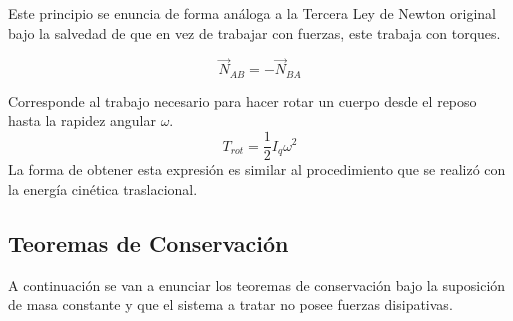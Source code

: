 \documentclass[/home/hernan/Documentos/Apuntes_mecanica_teorica/main.tex]{subfiles}
\begin{document}
	\newpage
	\begin{definition} 
		Este principio se enuncia de forma análoga a la Tercera Ley de Newton original bajo la salvedad de que en vez de trabajar con fuerzas, este trabaja con torques.

		\begin{equation}
			\vec{N}_{AB} = - \vec{N}_{BA}
			\label{eq: NThirdlawrot}
		\end{equation}
		
	\end{definition}

	\begin{definition}
		Corresponde al trabajo necesario para hacer rotar un cuerpo desde el reposo hasta la rapidez angular $\omega$.
		\begin{equation}
			T_{rot} = \frac{1}{2}I_{q}\omega^{2}
			\label{eq: Trot}
		\end{equation}
		La forma de obtener esta expresión es similar al procedimiento que se realizó con la energía cinética traslacional.
	\end{definition}

	\subsection{Teoremas de Conservación}

	A continuación se van a enunciar los teoremas de conservación bajo la suposición de masa constante y que el sistema a tratar no posee fuerzas disipativas.
\end{document}

